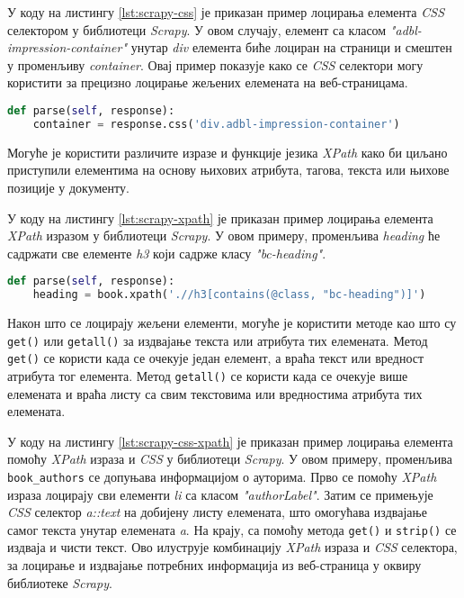\documentclass[12pt,oneside]{memoir}
\begin{document}
У коду на листингу \ref{lst:scrapy-css} је приказан пример лоцирања елемента \textit{CSS} селектором у библиотеци \textit{Scrapy}. У овом случају, елемент са класом \textit{"adbl-impression-container"} унутар \textit{div} елемента биће лоциран на страници и смештен у променљиву \textit{container}. Овај пример показује како се \textit{CSS} селектори могу користити за прецизно лоцирање жељених елемената на веб-страницама.
\begin{lstlisting}[language=Python, caption={Лоцирање елемента \textit{CSS} селектором}, label={lst:scrapy-css}]
def parse(self, response):
    container = response.css('div.adbl-impression-container')
\end{lstlisting}

Могуће је користити различите изразе и функције језика \textit{XPath} како би циљано приступили елементима на основу њихових атрибута, тагова, текста или њихове позиције у документу.

У коду на листингу \ref{lst:scrapy-xpath} је приказан пример лоцирања елемента \textit{XPath} изразом у библиотеци \textit{Scrapy}. У овом примеру, променљива \textit{heading} ће садржати све елементе \textit{h3} који садрже класу \textit{"bc-heading"}. 
\begin{lstlisting}[language=Python, caption={Лоцирање елемента \textit{XPath} изразом}, label={lst:scrapy-xpath}]
def parse(self, response):
    heading = book.xpath('.//h3[contains(@class, "bc-heading")]')
\end{lstlisting}

Након што се лоцирају жељени елементи, могуће је користити методе као што су \texttt{get()} или \texttt{getall()} за издвајање текста или атрибута тих елемената. Метод \texttt{get()} се користи када се очекује један елемент, а враћа текст или вредност атрибута тог елемента. Метод \texttt{getall()} се користи када се очекује више елемената и враћа листу са свим текстовима или вредностима атрибута тих елемената. 

У коду на листингу \ref{lst:scrapy-css-xpath} је приказан пример лоцирања елемента помоћу \textit{XPath} израза и \textit{CSS} у библиотеци \textit{Scrapy}. У овом примеру, променљива \texttt{book\_authors} се допуњава информацијом о ауторима. Прво се помоћу \textit{XPath} израза лоцирају сви елементи \textit{li} са класом \textit{"authorLabel"}. Затим се примењује \textit{CSS} селектор \textit{a::text} на добијену листу елемената, што омогућава издвајање самог текста унутар елемената \textit{a}. На крају, са помоћу метода \texttt{get()} и \texttt{strip()} се издваја и чисти текст. Ово илуструје комбинацију \textit{XPath} израза и \textit{CSS} селектора, за лоцирање и издвајање потребних информација из веб-страница у оквиру библиотеке \textit{Scrapy}.
\end{document}
